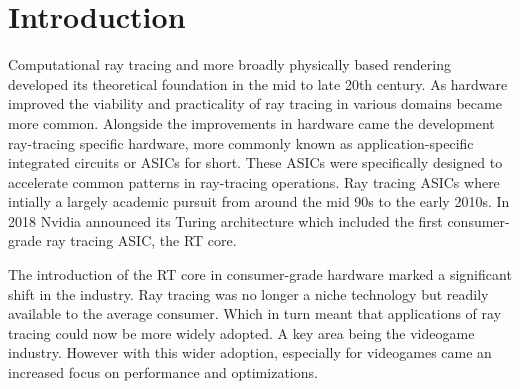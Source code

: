 \section{Introduction} \label{s:intro}






%     

Computational ray tracing and more broadly physically based rendering developed its theoretical foundation in the mid to late 20th century. As hardware improved the viability and practicality of ray tracing in various domains became more common. Alongside the improvements in hardware came the development ray-tracing specific hardware, more commonly known as application-specific integrated circuits or ASICs for short. These ASICs were specifically designed to accelerate common patterns in ray-tracing operations. Ray tracing ASICs where intially a largely academic pursuit from around the mid 90s to the early 2010s. In 2018 Nvidia announced its Turing architecture which included the first consumer-grade ray tracing ASIC, the RT core. 

The introduction of the RT core in consumer-grade hardware marked a significant shift in the industry. Ray tracing was no longer a niche technology but readily available to the average consumer. Which in turn meant that applications of ray tracing could now be more widely adopted. A key area being the videogame industry. However with this wider adoption, especially for videogames came an increased focus on performance and optimizations.



